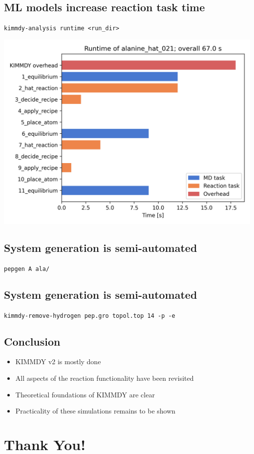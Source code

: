 \documentclass[
  letterpaper,
  DIV=11,
  numbers=noendperiod]{scrartcl}
\providecommand{\tightlist}{%
  \setlength{\itemsep}{0pt}\setlength{\parskip}{0pt}}\usepackage{longtable,booktabs,array}
\begin{document}
\hypertarget{ml-models-increase-reaction-task-time}{%
\subsection{ML models increase reaction task
time}\label{ml-models-increase-reaction-task-time}}

\texttt{kimmdy-analysis\ runtime\ \textless{}run\_dir\textgreater{}}

\includegraphics{www/ala_runtime.png}

\hypertarget{system-generation-is-semi-automated}{%
\subsection{System generation is
semi-automated}\label{system-generation-is-semi-automated}}

\texttt{pepgen\ A\ ala/}

\hypertarget{system-generation-is-semi-automated-1}{%
\subsection{System generation is
semi-automated}\label{system-generation-is-semi-automated-1}}

\texttt{kimmdy-remove-hydrogen\ pep.gro\ topol.top\ 14\ -p\ -e}

\hypertarget{conclusion}{%
\subsection{Conclusion}\label{conclusion}}

\begin{itemize}
\tightlist
\item
  KIMMDY v2 is mostly done
\item
  All aspects of the reaction functionality have been revisited
\item
  Theoretical foundations of KIMMDY are clear
\item
  Practicality of these simulations remains to be shown
\end{itemize}

\hypertarget{thank-you}{%
\section{Thank You!}\label{thank-you}}
\end{document}

